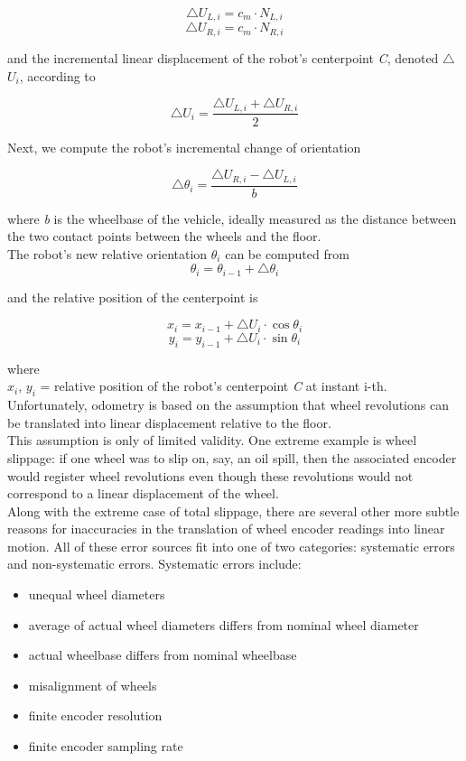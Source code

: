 \[
\bigtriangleup U_{L,i} = c_m \cdot N_{L,i}
\]
\[
\bigtriangleup U_{R,i} = c_m \cdot N_{R,i}
\]

and the incremental linear displacement of the robot's centerpoint
\textit{C}, denoted $\bigtriangleup$$U_{i}$, according to

\[
\bigtriangleup U_{i} =
\frac{{\bigtriangleup U_{L,i}} + {\bigtriangleup U_{R,i}}} {2}
\]

Next, we compute the robot's incremental change of orientation

\[
\bigtriangleup \theta_i =
\frac{{\bigtriangleup U_{R,i}} - {\bigtriangleup U_{L,i}}} {b}
\]

where \textit{b} is the wheelbase of the vehicle, ideally measured
as the distance between the two contact points between the wheels
and the floor.
\\
The robot's new relative orientation $\theta_i$ can be computed from
\[
\theta_i = \theta_{i-1} + \bigtriangleup \theta_i
\]

and the relative position of the centerpoint is

\[
x_i = x_{i-1} + \bigtriangleup U_{i} \cdot \cos \theta_i
\]
\[
y_i = y_{i-1} + \bigtriangleup U_{i} \cdot \sin \theta_i
\]

where
\\
\textit{$x_i$}, \textit{$y_i$} = relative position of the
robot's centerpoint \textit{C} at instant i-th.
\\
Unfortunately, odometry is
based on the assumption that wheel revolutions can be translated
into linear displacement relative to the floor.
\\
This assumption is only of limited validity. One extreme example is
wheel slippage: if one wheel was to slip on, say, an oil spill, then
the associated encoder would register wheel revolutions even though
these revolutions would not correspond to a linear displacement of the
wheel.
\\
Along with the extreme case of total slippage, there are several other
more subtle reasons for inaccuracies in the translation of wheel encoder
readings into linear motion. All of these error sources fit into one
of two categories: systematic errors and non-systematic errors.
Systematic errors include:

\begin{itemize}
\item unequal wheel diameters
\item average of actual wheel diameters differs from 
  nominal wheel diameter
\item actual wheelbase differs from nominal wheelbase
\item misalignment of wheels
\item finite encoder resolution
\item finite encoder sampling rate
\end{itemize}

